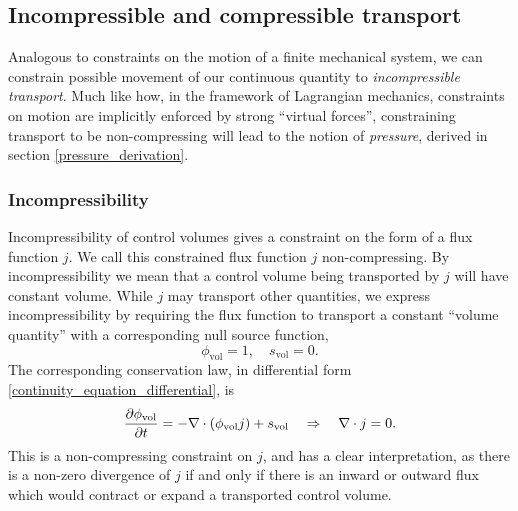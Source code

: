 \subsection{Incompressible and compressible transport}
Analogous to constraints on the motion of a finite mechanical system,
we can constrain possible movement of our continuous quantity to \textit{incompressible transport}. Much like how, in the framework of Lagrangian mechanics,
constraints on motion are implicitly enforced by strong ``virtual forces'', constraining transport to be non-compressing will lead to
the notion of \textit{pressure}, derived in section \ref{pressure_derivation}.

\subsubsection{Incompressibility}
Incompressibility of control volumes gives a constraint on the form of a flux function $j$.
We call this constrained flux function $j$ non-compressing.
By incompressibility we mean that a control volume being transported by $j$ will have
constant volume. While $j$ may transport other quantities, we express incompressibility by requiring the flux function to transport a constant ``volume quantity''
with a corresponding null source function,
    $$\phi_{\text{vol}} = 1,\quad s_{\text{vol}} = 0.$$
The corresponding conservation law, in differential form \eqref{continuity_equation_differential}, is
\begin{equation}\label{volume_conservation_law}
    \frac{\partial \phi_{\text{vol}}}{\partial t} = -\nabla \cdot (\phi_{\text{vol}}j) + s_{\text{vol}}
        \quad\Rightarrow\quad \nabla\cdot j = 0.
\end{equation}
This is a non-compressing constraint on $j$, and has a clear interpretation, as there is a non-zero divergence of $j$ if and only if
there is an inward or outward flux which would contract or expand a transported control volume.
